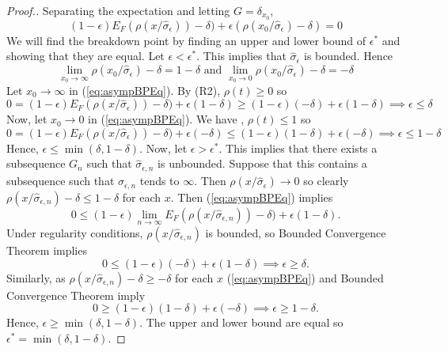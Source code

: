 \begin{proof}[Proof.]
Separating the expectation and letting $G = \delta_{x_0}$,
\begin{equation}
\label{eq:asympBPEq}
    (1-\epsilon) E_F (\rho(x/\hat\sigma_\epsilon)) - \delta) + \epsilon(\rho(x_0/\hat\sigma_\epsilon) - \delta) = 0
\end{equation}
We will find the breakdown point by finding an upper and lower bound of $\epsilon^*$ and showing that they are equal. Let $\epsilon < \epsilon^*$. This implies that $\hat \sigma_\epsilon$ is bounded. Hence
\begin{equation}
    \lim_{x_0 \xrightarrow{} \infty} \rho(x_0/\hat\sigma_\epsilon) - \delta = 1 - \delta \text{ and } \lim_{x_0 \xrightarrow{} 0} \rho(x_0/\hat\sigma_\epsilon) - \delta = - \delta
\end{equation}
Let $x_0 \xrightarrow{} \infty$ in (\ref{eq:asympBPEq}). By (R2), $\rho(t) \geq 0$ so
\begin{equation}
\label{eq:asympBPEq}
    0 = (1-\epsilon) E_F (\rho(x/\hat\sigma_\epsilon)) - \delta) + \epsilon(1 - \delta) \geq (1-\epsilon) (-\delta) + \epsilon(1 - \delta) \implies \epsilon \leq \delta
\end{equation}
Now, let $x_0 \xrightarrow{} 0$ in (\ref{eq:asympBPEq}). We have , $\rho(t) \leq 1$ so
\begin{equation}
\label{eq:asympBPEq}
    0 = (1-\epsilon) E_F (\rho(x/\hat\sigma_\epsilon)) - \delta) + \epsilon(- \delta) \leq (1-\epsilon) (1 -\delta) + \epsilon( - \delta) \implies \epsilon \leq 1 - \delta
\end{equation}
Hence, $\epsilon \leq \min(\delta,1-\delta)$. Now, let $\epsilon > \epsilon^*$. This implies that there exists a subsequence $G_n$ such that $\hat \sigma_{\epsilon,n}$ is unbounded. Suppose that this contains a subsequence such that $\hat \hat \sigma_{\epsilon,n}$ tends to $\infty$. Then $\rho(x/\hat\sigma_\epsilon) \xrightarrow{} 0$ so clearly $\rho(x/\hat \sigma_{\epsilon,n}) -\delta \leq 1-\delta$ for each $x$. Then (\ref{eq:asympBPEq}) implies
\begin{equation}
\label{eq:asympBPEq}
    0 \leq (1-\epsilon) \lim_{n \xrightarrow{} \infty} E_F (\rho(x/\hat \sigma_{\epsilon,n})) - \delta) + \epsilon(1 - \delta).
\end{equation}
Under regularity conditions, $\rho(x/\hat \sigma_{\epsilon,n})$ is bounded, so Bounded Convergence Theorem implies
\begin{equation}
\label{eq:asympBPEq}
    0 \leq (1-\epsilon) ( - \delta) + \epsilon(1 - \delta) \implies \epsilon \geq \delta.
\end{equation}
Similarly, as $\rho(x/\hat \sigma_{\epsilon,n}) -\delta \geq -\delta$ for each $x$ (\ref{eq:asympBPEq})  and Bounded Convergence Theorem imply
\begin{equation}
\label{eq:asympBPEq}
    0 \geq (1-\epsilon) (1 - \delta) + \epsilon( - \delta) \implies \epsilon \geq 1 - \delta.
\end{equation}
Hence, $\epsilon \geq \min(\delta, 1 - \delta)$. The upper and lower bound are equal so $\epsilon^* = \min(\delta, 1 - \delta)$.
\end{proof}

